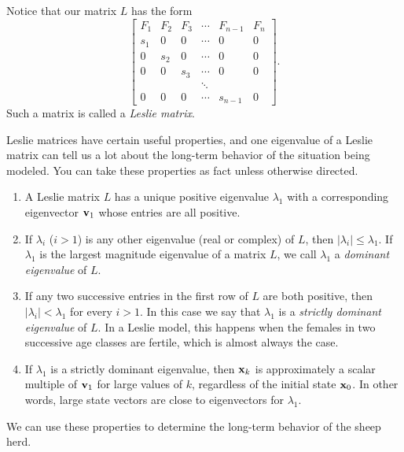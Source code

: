 Notice that our matrix $L$ has the form 
\[\left[ \begin{array}{cccccc} F_1&F_2&F_3&\cdots&F_{n-1}&F_n \\ s_1&0&0&\cdots&0&0 \\ 0&s_2&0&\cdots&0&0 \\  0&0&s_3&\cdots&0&0 \\ &&&\ddots&& \\ 0&0&0&\cdots&s_{n-1}&0 \end{array} \right].\]
Such a matrix is called a \emph{Leslie matrix}. 

Leslie matrices have certain useful properties, and one eigenvalue of a Leslie matrix can tell us a lot about the long-term behavior of the situation being modeled. You can take these properties as fact unless otherwise directed.
\begin{enumerate}
\item A Leslie matrix $L$ has a unique positive eigenvalue $\lambda_1$ with a corresponding eigenvector $\mathbf{v}_1$ whose entries are all positive.

\item If $\lambda_i$ ($i > 1$) is any other eigenvalue (real or complex) of $L$, then $|\lambda_i| \leq \lambda_1$. If $\lambda_1$ is the largest magnitude eigenvalue of a matrix $L$, we call $\lambda_1$ a \emph{dominant eigenvalue} of $L$.

\item If any two successive entries in the first row of $L$ are both positive, then $|\lambda_i| < \lambda_1$ for every $i > 1$. In this case we say that $\lambda_1$ is a \emph{strictly dominant eigenvalue} of $L$. In a Leslie model, this happens when the females in two successive age classes are fertile, which is almost always the case.

\item If $\lambda_1$ is a strictly dominant eigenvalue, then $\mathbf{x}_k$ is approximately a scalar multiple of $\mathbf{v}_1$ for large values of $k$, regardless of the initial state $\mathbf{x}_0$. In other words, large state vectors are close to eigenvectors for $\lambda_1$.
\end{enumerate}

We can use these properties to determine the long-term behavior of the sheep herd.

